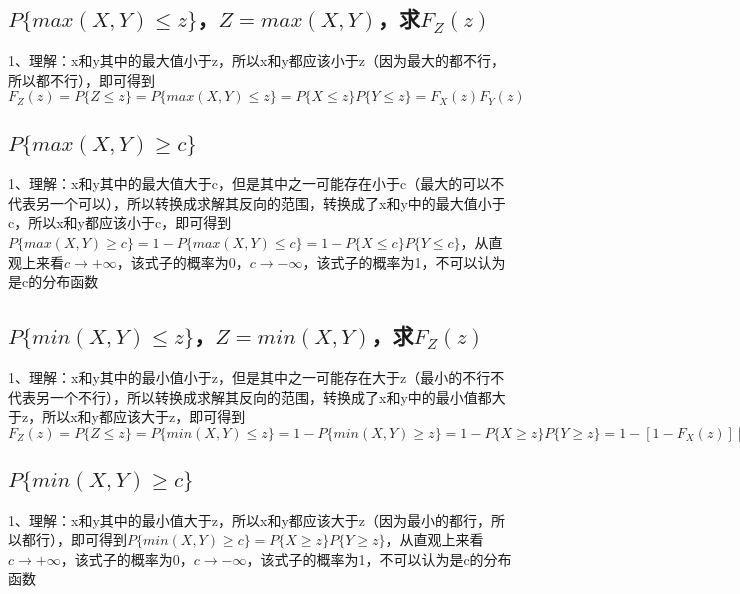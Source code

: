 \subsection{$P\{max(X,Y)\le z\}$，$Z=max(X,Y)$，求$F_Z(z)$}

1、理解：x和y其中的最大值小于z，所以x和y都应该小于z（因为最大的都不行，所以都不行），即可得到$F_{Z}(z)=P\{Z\le z\}=P\{max(X,Y)\le z\}=P\{X \le z\}P\{Y \le z\}=F_X(z)F_Y(z)$



\subsection{$P\{max(X,Y)\ge c\}$}

1、理解：x和y其中的最大值大于c，但是其中之一可能存在小于c（最大的可以不代表另一个可以），所以转换成求解其反向的范围，转换成了x和y中的最大值小于c，所以x和y都应该小于c，即可得到$P\{max(X,Y)\ge c\}=1-P\{max(X,Y)\le c\}=1-P\{X \le c\}P\{Y \le c\}$，从直观上来看$c \rightarrow +\infty$，该式子的概率为0，$c \rightarrow -\infty$，该式子的概率为1，不可以认为是c的分布函数



\subsection{$P\{min(X,Y)\le z\}$，$Z=min(X,Y)$，求$F_Z(z)$}

1、理解：x和y其中的最小值小于z，但是其中之一可能存在大于z（最小的不行不代表另一个不行），所以转换成求解其反向的范围，转换成了x和y中的最小值都大于z，所以x和y都应该大于z，即可得到$F_{Z}(z)=P\{Z\le z\}=P\{min(X,Y)\le z\}=1-P\{min(X,Y)\ge z\}=1-P\{X \ge z\}P\{Y \ge z\}=1-[1-F_X(z)][1-F_Y(z)]$



\subsection{$P\{min(X,Y)\ge c\}$}

1、理解：x和y其中的最小值大于z，所以x和y都应该大于z（因为最小的都行，所以都行），即可得到$P\{min(X,Y)\ge c\}=P\{X \ge z\}P\{Y \ge z\}$，从直观上来看$c \rightarrow +\infty$，该式子的概率为0，$c \rightarrow -\infty$，该式子的概率为1，不可以认为是c的分布函数

